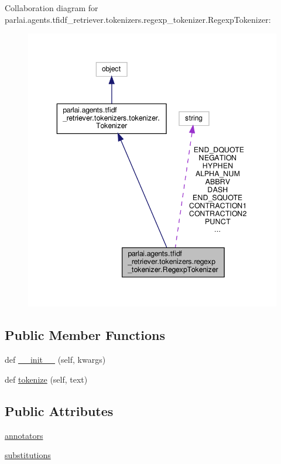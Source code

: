 Collaboration diagram for parlai.\+agents.\+tfidf\+\_\+retriever.\+tokenizers.\+regexp\+\_\+tokenizer.\+Regexp\+Tokenizer\+:
\nopagebreak
\begin{figure}[H]
\begin{center}
\leavevmode
\includegraphics[width=343pt]{d1/d9f/classparlai_1_1agents_1_1tfidf__retriever_1_1tokenizers_1_1regexp__tokenizer_1_1RegexpTokenizer__coll__graph}
\end{center}
\end{figure}
\subsection*{Public Member Functions}
\begin{DoxyCompactItemize}
\item 
def \hyperlink{classparlai_1_1agents_1_1tfidf__retriever_1_1tokenizers_1_1regexp__tokenizer_1_1RegexpTokenizer_af18fd6e3cb635cf6a05f32b90fb51fcc}{\+\_\+\+\_\+init\+\_\+\+\_\+} (self, kwargs)
\item 
def \hyperlink{classparlai_1_1agents_1_1tfidf__retriever_1_1tokenizers_1_1regexp__tokenizer_1_1RegexpTokenizer_aed53e2811a6c13818061b300311fde1a}{tokenize} (self, text)
\end{DoxyCompactItemize}
\subsection*{Public Attributes}
\begin{DoxyCompactItemize}
\item 
\hyperlink{classparlai_1_1agents_1_1tfidf__retriever_1_1tokenizers_1_1regexp__tokenizer_1_1RegexpTokenizer_ae51dae33c902220b106a5537c07f02bc}{annotators}
\item 
\hyperlink{classparlai_1_1agents_1_1tfidf__retriever_1_1tokenizers_1_1regexp__tokenizer_1_1RegexpTokenizer_a59668153f48d9c70ab5b07f2f9a79d7f}{substitutions}
\end{DoxyCompactItemize}
